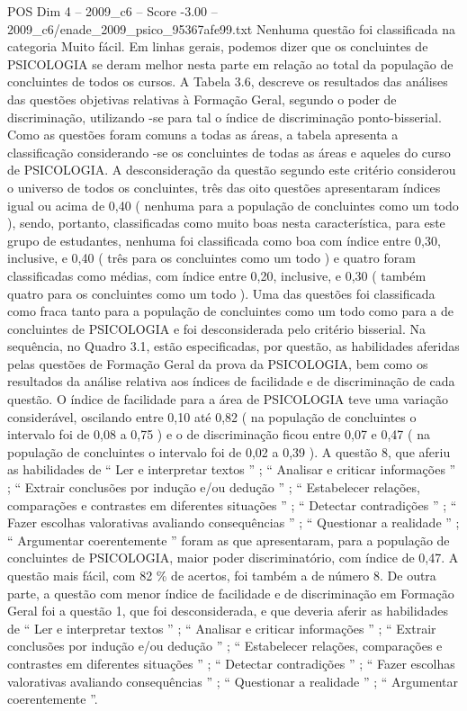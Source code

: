 \begin{textsample}{POS Dim 4 – 2009\_c6 – Score -3.00 – 2009\_c6/enade\_2009\_psico\_95367afe99.txt}
Nenhuma questão foi classificada na categoria Muito fácil.
Em linhas gerais, podemos dizer que os concluintes de PSICOLOGIA se deram melhor nesta parte em relação ao total da população de concluintes de todos os cursos.
A Tabela 3.6, descreve os resultados das análises das questões objetivas relativas à Formação Geral, segundo o poder de discriminação, utilizando -se para tal o índice de discriminação ponto-bisserial.
Como as questões foram comuns a todas as áreas, a tabela apresenta a classificação considerando -se os concluintes de todas as áreas e aqueles do curso de PSICOLOGIA.
A desconsideração da questão segundo este critério considerou o universo de todos os concluintes, três das oito questões apresentaram índices igual ou acima de 0,40 ( nenhuma para a população de concluintes como um todo ), sendo, portanto, classificadas como muito boas nesta característica, para este grupo de estudantes, nenhuma foi classificada como boa com índice entre 0,30, inclusive, e 0,40 ( três para os concluintes como um todo ) e quatro foram classificadas como médias, com índice entre 0,20, inclusive, e 0,30 ( também quatro para os concluintes como um todo ).
Uma das questões foi classificada como fraca tanto para a população de concluintes como um todo como para a de concluintes de PSICOLOGIA e foi desconsiderada pelo critério bisserial.
Na sequência, no Quadro 3.1, estão especificadas, por questão, as habilidades aferidas pelas questões de Formação Geral da prova da PSICOLOGIA, bem como os resultados da análise relativa aos índices de facilidade e de discriminação de cada questão.
O índice de facilidade para a área de PSICOLOGIA teve uma variação considerável, oscilando entre 0,10 até 0,82 ( na população de concluintes o intervalo foi de 0,08 a 0,75 ) e o de discriminação ficou entre 0,07 e 0,47 ( na população de concluintes o intervalo foi de 0,02 a 0,39 ).
A questão 8, que aferiu as habilidades de “ Ler e interpretar textos ” ; “ Analisar e criticar informações ” ; “ Extrair conclusões por indução e/ou dedução ” ; “ Estabelecer relações, comparações e contrastes em diferentes situações ” ; “ Detectar contradições ” ; “ Fazer escolhas valorativas avaliando consequências ” ; “ Questionar a realidade ” ; “ Argumentar coerentemente ” foram as que apresentaram, para a população de concluintes de PSICOLOGIA, maior poder discriminatório, com índice de 0,47.
A questão mais fácil, com 82 \% de acertos, foi também a de número 8.
De outra parte, a questão com menor índice de facilidade e de discriminação em Formação Geral foi a questão 1, que foi desconsiderada, e que deveria aferir as habilidades de “ Ler e interpretar textos ” ; “ Analisar e criticar informações ” ; “ Extrair conclusões por indução e/ou dedução ” ; “ Estabelecer relações, comparações e contrastes em diferentes situações ” ; “ Detectar contradições ” ; “ Fazer escolhas valorativas avaliando consequências ” ; “ Questionar a realidade ” ; “ Argumentar coerentemente ”.

\end{textsample}
